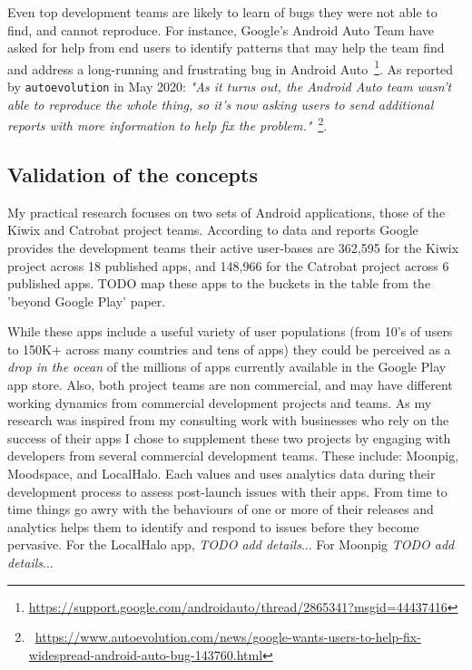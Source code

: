 Even top development teams are likely to learn of bugs they were not able to find, and cannot reproduce. For instance, Google's Android Auto Team have asked for help from end users to identify patterns that may help the team find and address a long-running and frustrating bug in Android Auto~\footnote{\url{https://support.google.com/androidauto/thread/2865341?msgid=44437416}}. As reported by \texttt{autoevolution} in May 2020:  
\emph{"As it turns out, the Android Auto team wasn’t able to reproduce the whole thing, so it’s now asking users to send additional reports with more information to help fix the problem."}~\footnote{~\url{https://www.autoevolution.com/news/google-wants-users-to-help-fix-widespread-android-auto-bug-143760.html}}.


\subsection{Validation of the concepts}
My practical research focuses on two sets of Android applications, those of the Kiwix and Catrobat project teams. According to data and reports Google provides the development teams their active user-bases are 362,595 for the Kiwix project across 18 published apps, and 148,966 for the Catrobat project across 6 published apps. %
TODO map these apps to the buckets in the table from the 'beyond Google Play' paper.

While these apps include a useful variety of user populations (from 10's of users to 150K+ across many countries and tens of apps) they could be perceived as a \emph{drop in the ocean} of the millions of apps currently available in the Google Play app store. Also, both project teams are non commercial, and may have different working dynamics from commercial development projects and teams. As my research was inspired from my consulting work with businesses who rely on the success of their apps I chose to supplement these two projects by engaging with developers from several commercial development teams. These include: Moonpig, Moodspace, and LocalHalo. Each values and uses analytics data during their development process to assess post-launch issues with their apps. From time to time things go awry with the behaviours of one or more of their releases and analytics helps them to identify and respond to issues before they become pervasive. For the LocalHalo app, \emph{TODO add details}... For Moonpig \emph{TODO add details}...

